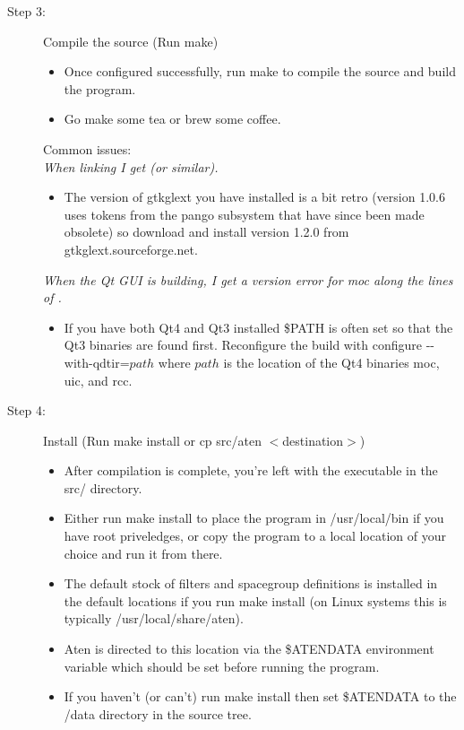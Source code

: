 \begin{description}
	\item[Step 3:\its] Compile the source (Run {\sffamily make})
	\begin{itemize}
		\item Once configured successfully, run {\sffamily make} to compile the source and build the program.
		\item Go make some tea or brew some coffee.
	\end{itemize}
	Common issues:\\
	\emph{When linking I get  (or similar).}
	\begin{itemize}
		\item The version of gtkglext you have installed is a bit retro (version 1.0.6 uses tokens from the pango subsystem that have since been made obsolete) so download and install version 1.2.0 from gtkglext.sourceforge.net.
	\end{itemize}
	\emph{When the Qt GUI is building, I get a version error for {\sffamily moc} along the lines of .}
	\begin{itemize}
		\item If you have both Qt4 and Qt3 installed \$PATH is often set so that the Qt3 binaries are found first. Reconfigure the build with {\sffamily configure {-}{-}with-qdtir=$path$} where $path$ is the location of the Qt4 binaries {\sffamily moc}, {\sffamily uic}, and {\sffamily rcc}.
	\end{itemize}

\end{description}

\begin{description}
	\item[Step 4:\its] Install (Run {\sffamily make install} or {\sffamily cp src/aten $<$destination$>$})
	\begin{itemize}
		\item After compilation is complete, you're left with the \progname{} executable in the src/ directory.
		\item Either run {\sffamily make install} to place the program in {\sffamily /usr/local/bin} if you have root priveledges, or copy the program to a local location of your choice and run it from there.
		\item The default stock of filters and spacegroup definitions is installed in the default locations if you run {\sffamily make install} (on Linux systems this is typically /usr/local/share/aten).
		\item Aten is directed to this location via the \$ATENDATA environment variable which should be set before running the program.
		\item If you haven't (or can't) run {\sffamily make install} then set \$ATENDATA to the /data directory in the source tree.
	\end{itemize}
\end{description}


